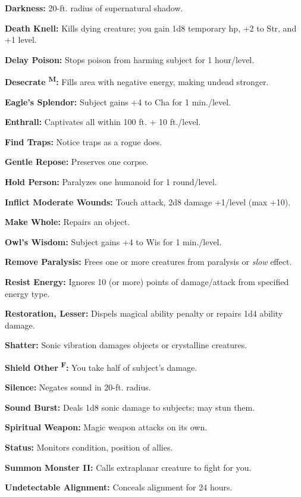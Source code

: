 \documentclass{article}
\begin{document}
\textbf{Darkness:} 20-ft. radius of supernatural shadow.

\textbf{Death Knell:} Kills dying creature; you gain 1d8 temporary hp, +2 to Str, 
and +1 level.

\textbf{Delay Poison:} Stops poison from harming subject for 1 hour/level.

\textbf{Desecrate }\textsuperscript{\textbf{M}}\textbf{:} Fills area with negative 
energy, making undead stronger.

\textbf{Eagle's Splendor:} Subject gains +4 to Cha for 1 min./level.

\textbf{Enthrall:} Captivates all within 100 ft. + 10 ft./level.

\textbf{Find Traps:} Notice traps as a rogue does.

\textbf{Gentle Repose:} Preserves one corpse.

\textbf{Hold Person:} Paralyzes one humanoid for 1 round/level.

\textbf{Inflict Moderate Wounds:} Touch attack, 2d8 damage +1/level (max +10).

\textbf{Make Whole:} Repairs an object.

\textbf{Owl's Wisdom:} Subject gains +4 to Wis for 1 min./level.

\textbf{Remove Paralysis:} Frees one or more creatures from paralysis or \textit{slow 
}effect.

\textbf{Resist Energy:} Ignores 10 (or more) points of damage/attack from specified 
energy type.

\textbf{Restoration, Lesser:} Dispels magical ability penalty or repairs 1d4 ability 
damage.

\textbf{Shatter:} Sonic vibration damages objects or crystalline creatures.

\textbf{Shield Other }\textsuperscript{\textbf{F}}\textbf{:} You take half of subject's 
damage.

\textbf{Silence:} Negates sound in 20-ft. radius.

\textbf{Sound Burst:} Deals 1d8 sonic damage to subjects; may stun them.

\textbf{Spiritual Weapon: }Magic weapon attacks on its own.

\textbf{Status: }Monitors condition, position of allies.

\textbf{Summon Monster II:} Calls extraplanar creature to fight for you.

\textbf{Undetectable Alignment:} Conceals alignment for 24 hours.
\end{document}
